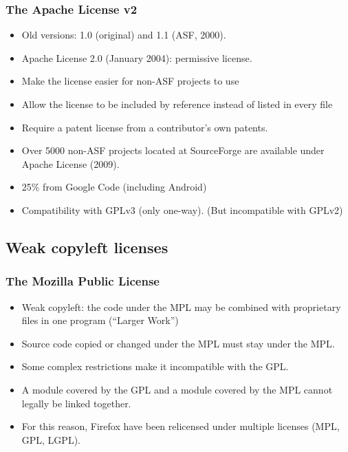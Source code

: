 
\begin{frame}
\frametitle{The Apache License v2}

\begin{itemize}
\item Old versions: 1.0 (original) and 1.1 (ASF, 2000).
\item Apache License 2.0 (January 2004): permissive license.
\item Make the license easier for non-ASF projects to use
\item Allow the license to be included by reference instead of listed in every file
\item Require a patent license from a contributor's own patents.
\item Over 5000 non-ASF projects located at SourceForge are available under Apache License (2009). 
\item 25\% from Google Code (including Android)
\item Compatibility with GPLv3 (only one-way). (But incompatible with GPLv2)

\end{itemize}

\end{frame}

\subsection{Weak copyleft licenses}

\begin{frame}
\frametitle{The Mozilla Public License}

\begin{itemize}
\item Weak copyleft: the code under the MPL may be combined with proprietary files in one program (``Larger Work'')
\item Source code copied or changed under the MPL must stay under the MPL.
\item Some complex restrictions make it incompatible with the GPL.
\item A module covered by the GPL and a module covered by the MPL cannot legally be linked together.
\item For this reason, Firefox have been relicensed under multiple licenses (MPL, GPL, LGPL).
\end{itemize}

\end{frame}

